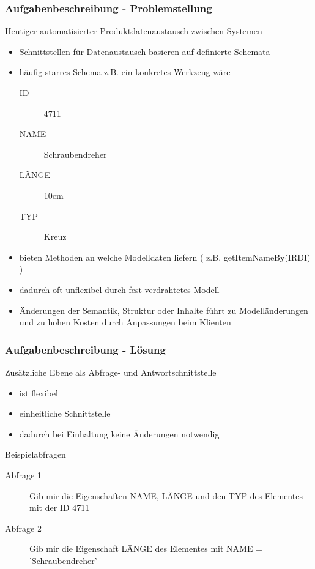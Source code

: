 \documentclass[serif,mathserif]{beamer}
\begin{document}
\begin{frame}
  \frametitle{Aufgabenbeschreibung - Problemstellung}
  Heutiger automatisierter Produktdatenaustausch zwischen Systemen
  \begin{itemize}
  \item Schnittstellen für Datenaustausch basieren auf definierte Schemata
  \item häufig starres Schema z.B. ein konkretes Werkzeug wäre
      \begin{description}
      \item[ID] 4711
      \item[NAME] Schraubendreher
      \item[LÄNGE] 10cm 
      \item[TYP] Kreuz 
      \end{description}
  \item bieten Methoden an welche Modelldaten liefern ( z.B. getItemNameBy(IRDI) )
  \item dadurch oft unflexibel durch fest verdrahtetes Modell 
  \item Änderungen der Semantik, Struktur oder Inhalte führt zu Modelländerungen und zu hohen Kosten durch Anpassungen beim Klienten
  \end{itemize}
\end{frame}


\begin{frame}
  \frametitle{Aufgabenbeschreibung - Lösung}
  Zusätzliche Ebene als Abfrage- und Antwortschnittstelle
  \begin{itemize}
  \item ist flexibel
  \item einheitliche Schnittstelle
  \item dadurch bei Einhaltung keine Änderungen notwendig
  \end{itemize}
  Beispielabfragen
      \begin{description}
      \item[Abfrage 1] Gib mir die Eigenschaften NAME, LÄNGE und den TYP des Elementes mit der ID 4711
      \item[Abfrage 2] Gib mir die Eigenschaft LÄNGE des Elementes mit NAME = 'Schraubendreher'
      \end{description}
\end{frame}
\end{document}
